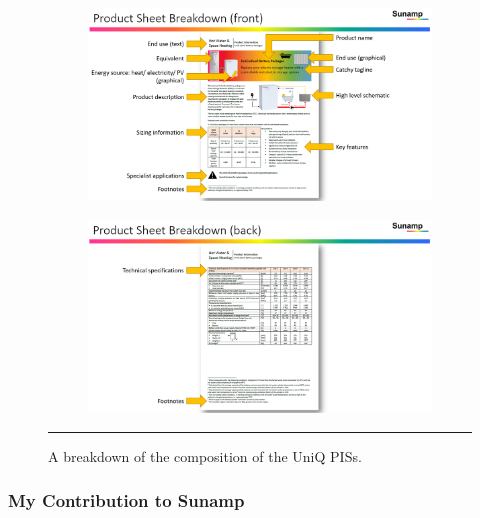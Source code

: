 \begin{figure}[htbp]
	\centering
	\begin{subfigure}{\textwidth}
		\centering
		\includegraphics[width=\textwidth]{figures/PIS_breakdown_01.PNG}
		\label{breakdown01}
	\end{subfigure}
	\begin{subfigure}{\textwidth}
		\centering
		\includegraphics[width=\textwidth]{figures/PIS_breakdown_02.PNG}
		\label{breakdown01}
	\end{subfigure}
	\rule{\textwidth}{0.5pt} %
	\caption{A breakdown of the composition of the UniQ PISs.}
	\label{breakdown}
\end{figure}




\subsubsection{My Contribution to Sunamp}

